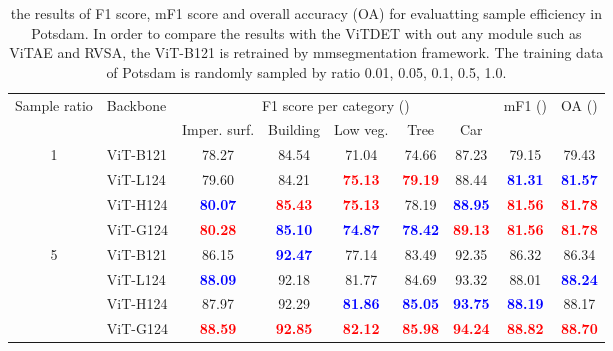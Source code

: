 \begin{table*}[ht]{\textwidth=0mm}
    \centering
    \caption{the results of F1 score, mF1 score and overall accuracy (OA) for evaluatting sample efficiency in Potsdam. In order to compare the results with the ViTDET with out any module such as ViTAE and RVSA, the ViT-B121 is retrained by mmsegmentation framework. The training data of Potsdam is randomly sampled by ratio 0.01, 0.05, 0.1, 0.5, 1.0.}
    \renewcommand{\arraystretch}{1.25}
    {
    \begin{tabular}{c | l | c c c c c | c | c }
        \hline

        \multirow{2}{*}{Sample ratio} & \multirow{2}{*}{Backbone} & \multicolumn{5}{c|}{F1 score per category ()} & \multirow{2}{*}{mF1 ()} & \multirow{2}{*}{OA ()} \\ \cline{3-7}
         &  & Imper. surf. & Building & Low veg. & Tree & Car & & \\ \hline

        \multirow{4}{*}{1} & ViT-B121\cite{wang2022advancing} & 78.27 & 84.54 & 71.04 & 74.66 & 87.23 & 79.15 & 79.43 \\
        & ViT-L124 & 79.60 & 84.21 & \textbf{\textcolor{red}{75.13}} & \textbf{\textcolor{red}{79.19}} & 88.44 & \textbf{\textcolor{blue}{81.31}} & \textbf{\textcolor{blue}{81.57}} \\
        & ViT-H124 & \textbf{\textcolor{blue}{80.07}} & \textbf{\textcolor{red}{85.43}} & \textbf{\textcolor{red}{75.13}} & 78.19 & \textbf{\textcolor{blue}{88.95}} & \textbf{\textcolor{red}{81.56}} & \textbf{\textcolor{red}{81.78}} \\
        & ViT-G124 & \textbf{\textcolor{red}{80.28}} & \textbf{\textcolor{blue}{85.10}} & \textbf{\textcolor{blue}{74.87}} & \textbf{\textcolor{blue}{78.42}} & \textbf{\textcolor{red}{89.13}} & \textbf{\textcolor{red}{81.56}} & \textbf{\textcolor{red}{81.78}} \\ \hline

        \multirow{4}{*}{5} & ViT-B121\cite{wang2022advancing} & 86.15 & \textbf{\textcolor{blue}{92.47}} & 77.14 & 83.49 & 92.35 & 86.32 & 86.34 \\
        & ViT-L124 & \textbf{\textcolor{blue}{88.09}} & 92.18 & 81.77 & 84.69 & 93.32 & 88.01 & \textbf{\textcolor{blue}{88.24}} \\
        & ViT-H124 & 87.97 & 92.29 & \textbf{\textcolor{blue}{81.86}} & \textbf{\textcolor{blue}{85.05}} & \textbf{\textcolor{blue}{93.75}} & \textbf{\textcolor{blue}{88.19}} & 88.17 \\
        & ViT-G124 & \textbf{\textcolor{red}{88.59}} & \textbf{\textcolor{red}{92.85}} & \textbf{\textcolor{red}{82.12}} & \textbf{\textcolor{red}{85.98}} & \textbf{\textcolor{red}{94.24}} & \textbf{\textcolor{red}{88.82}} & \textbf{\textcolor{red}{88.70}} \\ \hline


\end{tabular}}
\end{table*}
